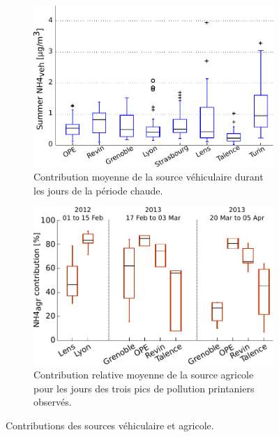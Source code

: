 \begin{figure}[ht]
    \begin{subfigure}[t]{0.5\textwidth}
    \begin{center}
    \includegraphics[width=.9\textwidth]{figures/INACS/MCA_contribSummerVeh.pdf}
    \end{center}
    \caption{Contribution moyenne de la source véhiculaire durant les jours de la période chaude.}
    \label{fig:summerNH4}
    \end{subfigure}
    \begin{subfigure}[t]{0.5\textwidth}
    \begin{center}
    \includegraphics[width=.9\textwidth]{figures/INACS/MCA_contribSpringEventAgr.pdf}
    \end{center}
    \caption{Contribution relative moyenne de la source agricole pour les jours des trois
    pics de pollution printaniers observés.}
    \label{fig:contribSpringAgr}
    \end{subfigure}
    \caption{Contributions des sources véhiculaire et agricole.}
\end{figure}


